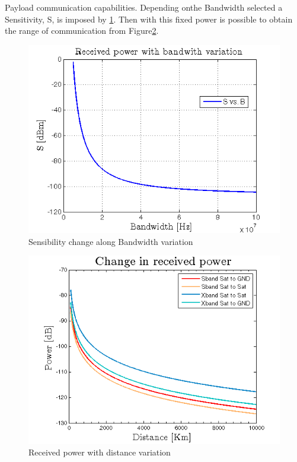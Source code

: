Payload communication capabilities. Depending onthe Bandwidth selected a Sensitivity, S, is imposed by \ref{SvsB}. Then with this fixed power is possible to obtain the range of communication from Figure\ref{friis}.
\begin{figure}[H]
	\includegraphics[scale=0.9]{./sections/SatelliteConfiguration/SvsB}
	\centering
	\caption{Sensibility change along Bandwidth variation}
	\label{SvsB}
\end{figure}
\clearpage
\begin{figure}[H]
	\includegraphics[scale=1.2]{./sections/SatelliteConfiguration/friisCases}
	\centering
	\caption{Received power with distance variation}
	\label{friis}
\end{figure}
\clearpage

